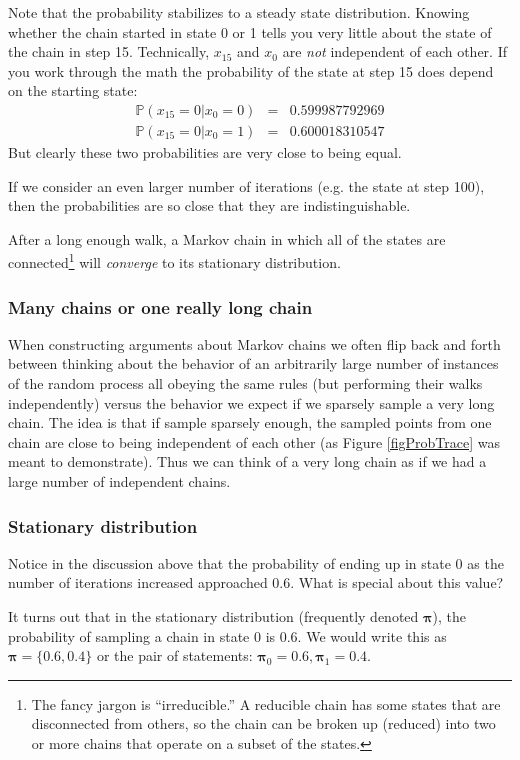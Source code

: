 \documentclass[11pt]{article}
\renewcommand{\Pr}{{\mathbb P}}
\begin{document}
Note that the probability stabilizes to a steady state distribution.
Knowing whether the chain started in state 0 or 1 tells you very little about the state of the chain in step 15.
Technically, $x_{15}$ and $x_0$ are {\em not} independent of each other.
If you work through the math the probability of the state at step 15 does depend on the starting state:
\begin{eqnarray*}
	\Pr(x_{15} = 0 | x_0 = 0) & = & 0.599987792969\\
	\Pr(x_{15} = 0 | x_0 = 1) & = & 0.600018310547
\end{eqnarray*}
But clearly these two probabilities are very close to being equal.

If we consider an even larger number of iterations (e.g. the state at step 100), then the probabilities are so close that they are indistinguishable.

After a long enough walk, a Markov chain in which all of the states are connected\footnote{The fancy jargon is ``irreducible.'' A reducible chain has some states that are disconnected from others, so the chain can be broken up (reduced) into two or more chains that operate on a subset of the states.} will {\em converge} to its stationary distribution.

\subsubsection*{Many chains or one really long chain}
When constructing arguments about Markov chains we often flip back and forth between thinking about the behavior of an arbitrarily large number of instances of the random process all obeying the same rules (but performing their walks independently) versus the behavior we expect if we sparsely sample a very long chain.
The idea is that if sample sparsely enough, the sampled points from one chain are close to being independent of each other (as Figure \ref{figProbTrace} was meant to demonstrate).
Thus we can think of a very long chain as if we had a large number of independent chains.


\subsubsection*{Stationary distribution}
Notice in the discussion above that the probability of ending up in state 0 as the number of iterations increased approached 0.6. What is special about this value?

It turns out that in the stationary distribution (frequently denoted $\bm \pi$), the probability of sampling a chain in state 0 is 0.6.
We would write this as $\bm \pi = \{0.6, 0.4\}$  or the pair of statements: $\bm \pi_0 = 0.6, \bm \pi_1 = 0.4$.
\end{document}
